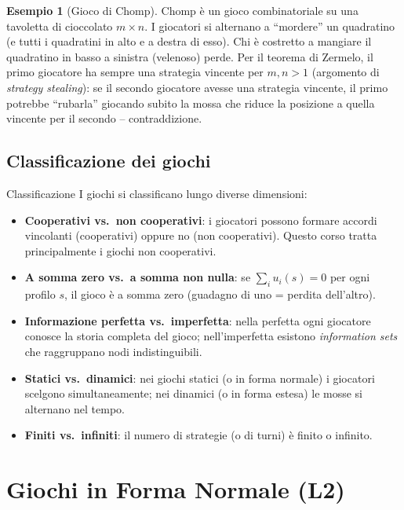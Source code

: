 \documentclass[12pt,a4paper,twoside]{book}
\theoremstyle{plain}
\theoremstyle{definition}
\newtheorem{example}[theorem]{Esempio}
\begin{document}
\begin{example}[Gioco di Chomp]
Chomp è un gioco combinatoriale su una tavoletta di cioccolato $m\times n$. I giocatori si alternano a ``mordere'' un quadratino (e tutti i quadratini in alto e a destra di esso). Chi è costretto a mangiare il quadratino in basso a sinistra (velenoso) perde. Per il teorema di Zermelo, il primo giocatore ha sempre una strategia vincente per $m,n>1$ (argomento di \emph{strategy stealing}): se il secondo giocatore avesse una strategia vincente, il primo potrebbe ``rubarla'' giocando subito la mossa che riduce la posizione a quella vincente per il secondo -- contraddizione.
\end{example}

\section{Classificazione dei giochi}

\begin{defbox}{Classificazione}
I giochi si classificano lungo diverse dimensioni:
\begin{itemize}
  \item \textbf{Cooperativi vs.\ non cooperativi}: i giocatori possono formare accordi vincolanti (cooperativi) oppure no (non cooperativi). Questo corso tratta principalmente i giochi non cooperativi.
  \item \textbf{A somma zero vs.\ a somma non nulla}: se $\sum_i u_i(s)=0$ per ogni profilo $s$, il gioco è a somma zero (guadagno di uno = perdita dell'altro).
  \item \textbf{Informazione perfetta vs.\ imperfetta}: nella perfetta ogni giocatore conosce la storia completa del gioco; nell'imperfetta esistono \emph{information sets} che raggruppano nodi indistinguibili.
  \item \textbf{Statici vs.\ dinamici}: nei giochi statici (o in forma normale) i giocatori scelgono simultaneamente; nei dinamici (o in forma estesa) le mosse si alternano nel tempo.
  \item \textbf{Finiti vs.\ infiniti}: il numero di strategie (o di turni) è finito o infinito.
\end{itemize}
\end{defbox}

\chapter{Giochi in Forma Normale (L2)}
\end{document}
